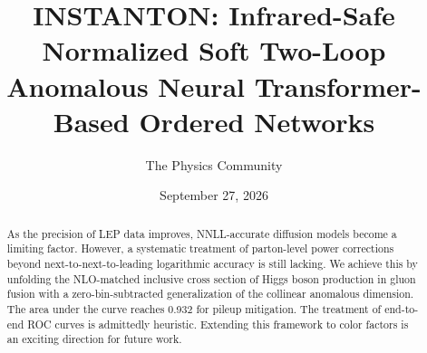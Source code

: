 \documentclass[11pt]{article}
\title{INSTANTON: Infrared-Safe Normalized Soft Two-Loop Anomalous Neural Transformer-Based Ordered Networks}
\author{The Physics Community}
\date{September 27, 2026}
\numberwithin{equation}{section}
\theoremstyle{definition}
\theoremstyle{remark}
\begin{document}
\maketitle
\begin{abstract}
As the precision of LEP data improves, NNLL-accurate diffusion models
become a limiting factor. However, a systematic treatment of
parton-level power corrections beyond next-to-next-to-leading
logarithmic accuracy is still lacking. We achieve this by unfolding the
NLO-matched inclusive cross section of Higgs boson production in gluon
fusion with a zero-bin-subtracted generalization of the collinear
anomalous dimension. The area under the curve reaches 0.932 for pileup
mitigation. The treatment of end-to-end ROC curves is admittedly
heuristic. Extending this framework to color factors is an exciting
direction for future work.
\end{abstract}
\tableofcontents




\nocite{*}


\end{document}
